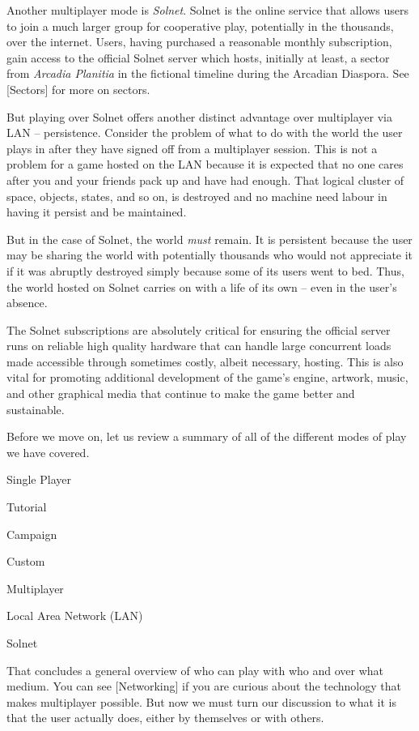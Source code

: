 

Another multiplayer mode is {\it Solnet}. Solnet is the online service that allows users to join a much larger group for cooperative play, potentially in the thousands, over the internet. Users, having purchased a reasonable monthly subscription, gain access to the official Solnet server which hosts, initially at least, a sector from {\it Arcadia Planitia} in the fictional timeline during the Arcadian Diaspora. See [Sectors] for more on sectors.

But playing over Solnet offers another distinct advantage over multiplayer via LAN -- persistence. Consider the problem of what to do with the world the user plays in after they have signed off from a multiplayer session. This is not a problem for a game hosted on the LAN because it is expected that no one cares after you and your friends pack up and have had enough. That logical cluster of space, objects, states, and so on, is destroyed and no machine need labour in having it persist and be maintained. 

But in the case of Solnet, the world {\it must} remain. It is persistent because the user may be sharing the world with potentially thousands who would not appreciate it if it was abruptly destroyed simply because some of its users went to bed. Thus, the world hosted on Solnet carries on with a life of its own -- even in the user's absence.

The Solnet subscriptions are absolutely critical for ensuring the official server runs on reliable high quality hardware that can handle large concurrent loads made accessible through sometimes costly, albeit necessary, hosting. This is also vital for promoting additional development of the game's engine, artwork, music, and other graphical media that continue to make the game better and sustainable.

Before we move on, let us review a summary of all of the different modes of play we have covered.

\startitemize[4]
    \item Single Player
        \startitemize[4]
        \item Tutorial
        \item Campaign
        \item Custom
        \stopitemize

    \item Multiplayer
        \startitemize[4]
        \item Local Area Network (LAN)
        \item Solnet
        \stopitemize
\stopitemize

That concludes a general overview of who can play with who and over what medium. You can see [Networking] if you are curious about the technology that makes multiplayer possible. But now we must turn our discussion to what it is that the user actually does, either by themselves or with others.

